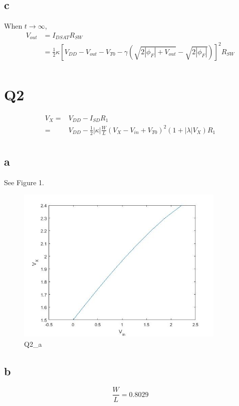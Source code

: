 \documentclass[a4paper,10pt]{article}
\begin{document}
\subsection*{c}
When \begin{math}t\rightarrow\infty\end{math},
\begin{equation}
\begin{split}
V_{out} &= I_{DSAT}R_{SW}\\
&= \frac{1}{2}\kappa[V_{DD} - V_{out} - V_{T0} - \gamma(\sqrt{2|\phi_F| + V_{out} } - \sqrt{2|\phi_F|})] ^2 R_{SW}\\
\end{split}
\end{equation}

\section*{Q2}
\begin{equation}
\begin{split}
V_X =& V_{DD} - I_{SD}R_1\\
=& V_{DD} - \frac{1}{2}|\kappa|\frac{W}{L}(V_X-V_{in}+V_{T0})^2 (1+|\lambda| V_X)R_1\\
\end{split}
\end{equation}
\subsection*{a}
See Figure 1.
\begin{figure}
 \centering
 \includegraphics[width=10cm]{Q2_a_1.jpg}
 \caption{Q2\_a}
\end{figure}
\subsection*{b}
\begin{equation}
\frac{W}{L} = 0.8029
\end{equation}
\end{document}
